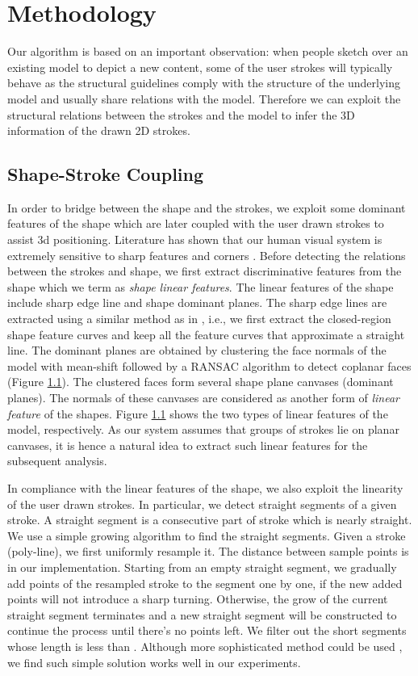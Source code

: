 \section{Methodology}

Our algorithm is based on an important observation: when people sketch over an existing model to depict a new content, some of the user strokes will typically behave as the structural guidelines comply with the structure of the underlying model and usually share relations with the model. Therefore we can exploit the structural relations between the strokes and the model to infer the 3{D} information of the drawn 2{D} strokes.


\subsection{Shape-Stroke Coupling}
In order to bridge between the shape and the strokes, we exploit some dominant features of the shape which are later coupled with the user drawn strokes to assist 3{d} positioning. Literature has shown that our human visual system is extremely sensitive to sharp features and corners \cite{line drawing}. Before detecting the relations between the strokes and shape, we first extract discriminative features from the shape which we term as \emph{shape linear features}. The linear features of the shape include sharp edge line and shape dominant planes. The sharp edge lines are extracted using a similar method as in \ca{[Iwire]}, i.e., we first extract the closed-region shape feature curves and keep all the feature curves that approximate a straight line. The dominant planes are obtained by clustering the face normals of the model with mean-shift followed by a RANSAC algorithm to detect coplanar faces (Figure \ref{}). The clustered faces form several shape plane canvases (dominant planes). The normals of these canvases are considered as another form of \emph{linear feature} of the shapes. Figure \ref{} shows the two types of linear features of the  model, respectively. As our system assumes that groups of strokes lie on planar canvases, it is hence a natural idea to extract such linear features for the subsequent analysis.

In compliance with the linear features of the shape, we also exploit the linearity of the user drawn strokes. In particular, we detect straight segments of a given stroke. A straight segment is a consecutive part of stroke which is nearly straight. We use a simple growing algorithm to find the straight segments. Given a stroke (poly-line), we first uniformly resample it. The distance between sample points is \ca{10px} in our implementation. Starting from an empty straight segment, we gradually add points of the resampled stroke to the segment one by one, if the new added points will not introduce a sharp turning. Otherwise, the grow of the current straight segment terminates and a new straight segment will be constructed to continue the process until there's no points left. We filter out the short segments whose length is less than \ca{50px}. Although more sophisticated method could be used \cite{Zheng2016}, we find such simple solution works well in our experiments.

